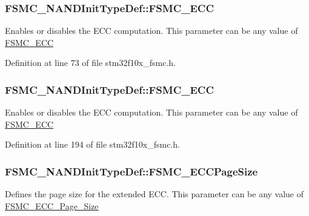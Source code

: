 \subsubsection[{\texorpdfstring{F\+S\+M\+C\+\_\+\+E\+CC}{FSMC_ECC}}]{ F\+S\+M\+C\+\_\+\+N\+A\+N\+D\+Init\+Type\+Def\+::\+F\+S\+M\+C\+\_\+\+E\+CC}\hypertarget{struct_f_s_m_c___n_a_n_d_init_type_def_afdee28036db97341491f790df8169570}{}\label{struct_f_s_m_c___n_a_n_d_init_type_def_afdee28036db97341491f790df8169570}
Enables or disables the E\+CC computation. This parameter can be any value of \hyperlink{group___f_s_m_c___e_c_c}{F\+S\+M\+C\+\_\+\+E\+CC} 

Definition at line 73 of file stm32f10x\+\_\+fsmc.\+h.

\subsubsection[{\texorpdfstring{F\+S\+M\+C\+\_\+\+E\+CC}{FSMC_ECC}}]{ F\+S\+M\+C\+\_\+\+N\+A\+N\+D\+Init\+Type\+Def\+::\+F\+S\+M\+C\+\_\+\+E\+CC}\hypertarget{struct_f_s_m_c___n_a_n_d_init_type_def_a58d0510c0ce0ae3d1e3863bf8f571377}{}\label{struct_f_s_m_c___n_a_n_d_init_type_def_a58d0510c0ce0ae3d1e3863bf8f571377}
Enables or disables the E\+CC computation. This parameter can be any value of \hyperlink{group___f_s_m_c___e_c_c}{F\+S\+M\+C\+\_\+\+E\+CC} 

Definition at line 194 of file stm32f10x\+\_\+fsmc.\+h.

\subsubsection[{\texorpdfstring{F\+S\+M\+C\+\_\+\+E\+C\+C\+Page\+Size}{FSMC_ECCPageSize}}]{ F\+S\+M\+C\+\_\+\+N\+A\+N\+D\+Init\+Type\+Def\+::\+F\+S\+M\+C\+\_\+\+E\+C\+C\+Page\+Size}\hypertarget{struct_f_s_m_c___n_a_n_d_init_type_def_a2230b5612c5ae810f57accc94ca49081}{}\label{struct_f_s_m_c___n_a_n_d_init_type_def_a2230b5612c5ae810f57accc94ca49081}
Defines the page size for the extended E\+CC. This parameter can be any value of \hyperlink{group___f_s_m_c___e_c_c___page___size}{F\+S\+M\+C\+\_\+\+E\+C\+C\+\_\+\+Page\+\_\+\+Size} 

